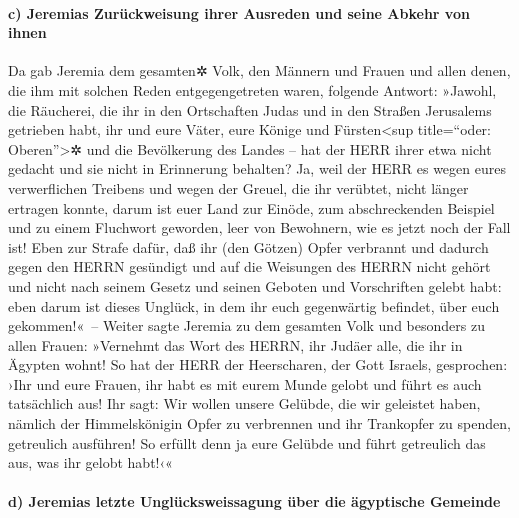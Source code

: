 \hypertarget{c-jeremias-zuruxfcckweisung-ihrer-ausreden-und-seine-abkehr-von-ihnen}{%
\paragraph{c) Jeremias Zurückweisung ihrer Ausreden und seine Abkehr von
ihnen}\label{c-jeremias-zuruxfcckweisung-ihrer-ausreden-und-seine-abkehr-von-ihnen}}

Da gab Jeremia dem gesamten✲ Volk, den Männern und Frauen
und allen denen, die ihm mit solchen Reden entgegengetreten waren,
folgende Antwort: »Jawohl, die Räucherei, die ihr in den
Ortschaften Judas und in den Straßen Jerusalems getrieben habt, ihr und
eure Väter, eure Könige und Fürsten\textless sup title=``oder:
Oberen''\textgreater✲ und die Bevölkerung des Landes -- hat der HERR
ihrer etwa nicht gedacht und sie nicht in Erinnerung behalten?
Ja, weil der HERR es wegen eures verwerflichen Treibens
und wegen der Greuel, die ihr verübtet, nicht länger ertragen konnte,
darum ist euer Land zur Einöde, zum abschreckenden Beispiel und zu einem
Fluchwort geworden, leer von Bewohnern, wie es jetzt noch der Fall ist!
Eben zur Strafe dafür, daß ihr (den Götzen) Opfer
verbrannt und dadurch gegen den HERRN gesündigt und auf die Weisungen
des HERRN nicht gehört und nicht nach seinem Gesetz und seinen Geboten
und Vorschriften gelebt habt: eben darum ist dieses Unglück, in dem ihr
euch gegenwärtig befindet, über euch gekommen!«~-- Weiter
sagte Jeremia zu dem gesamten Volk und besonders zu allen Frauen:
»Vernehmt das Wort des HERRN, ihr Judäer alle, die ihr in Ägypten wohnt!
So hat der HERR der Heerscharen, der Gott Israels,
gesprochen: ›Ihr und eure Frauen, ihr habt es mit eurem Munde gelobt und
führt es auch tatsächlich aus! Ihr sagt: Wir wollen unsere Gelübde, die
wir geleistet haben, nämlich der Himmelskönigin Opfer zu verbrennen und
ihr Trankopfer zu spenden, getreulich ausführen! So erfüllt denn ja eure
Gelübde und führt getreulich das aus, was ihr gelobt habt!‹«

\hypertarget{d-jeremias-letzte-ungluxfccksweissagung-uxfcber-die-uxe4gyptische-gemeinde}{%
\paragraph{d) Jeremias letzte Unglücksweissagung über die ägyptische
Gemeinde}\label{d-jeremias-letzte-ungluxfccksweissagung-uxfcber-die-uxe4gyptische-gemeinde}}

